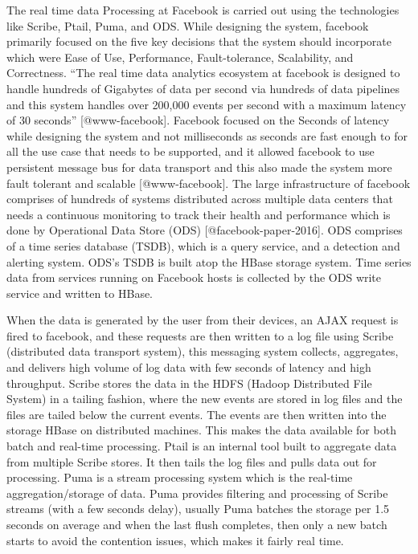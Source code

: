 The real time data Processing at Facebook is carried out using the
technologies like Scribe, Ptail, Puma, and ODS. While designing the
system, facebook primarily focused on the five key decisions that the
system should incorporate which were Ease of Use, Performance,
Fault-tolerance, Scalability, and Correctness. ``The real time data
analytics ecosystem at facebook is designed to handle hundreds of
Gigabytes of data per second via hundreds of data pipelines and this
system handles over 200,000 events per second with a maximum latency
of 30 seconds'' [@www-facebook]. Facebook focused on the Seconds
of latency while designing the system and not milliseconds as seconds
are fast enough to for all the use case that needs to be supported,
and it allowed facebook to use persistent message bus for data
transport and this also made the system more fault tolerant and
scalable [@www-facebook]. The large infrastructure of facebook
comprises of hundreds of systems distributed across multiple data
centers that needs a continuous monitoring to track their health and
performance which is done by Operational Data Store
(ODS) [@facebook-paper-2016]. ODS comprises of a time series
database (TSDB), which is a query service, and a detection and
alerting system. ODS's TSDB is built atop the HBase storage
system. Time series data from services running on Facebook hosts is
collected by the ODS write service and written to HBase.

When the data is generated by the user from their devices, an AJAX
request is fired to facebook, and these requests are then written to a
log file using Scribe (distributed data transport system), this
messaging system collects, aggregates, and delivers high volume of log
data with few seconds of latency and high throughput. Scribe stores
the data in the HDFS (Hadoop Distributed File System) in a tailing
fashion, where the new events are stored in log files and the files
are tailed below the current events. The events are then written into
the storage HBase on distributed machines. This makes the data
available for both batch and real-time processing. Ptail is an
internal tool built to aggregate data from multiple Scribe stores. It
then tails the log files and pulls data out for processing. Puma is a
stream processing system which is the real-time aggregation/storage of
data. Puma provides filtering and processing of Scribe streams (with a
few seconds delay), usually Puma batches the storage per 1.5 seconds
on average and when the last flush completes, then only a new batch
starts to avoid the contention issues, which makes it fairly real
time.
     
